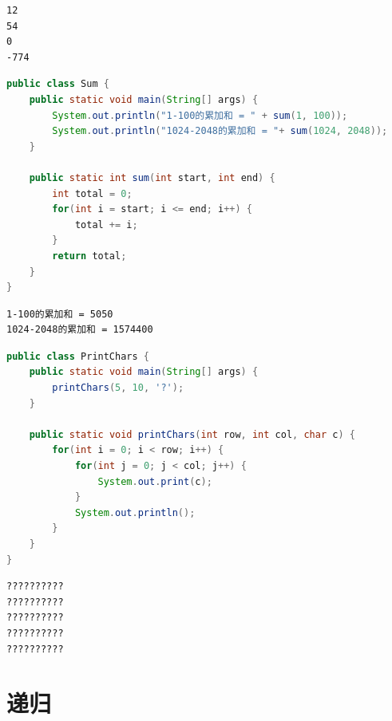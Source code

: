 \begin{tcolorbox}
	\begin{verbatim}
12
54
0
-774
	\end{verbatim}
\end{tcolorbox}

\vspace{0.5cm}


\begin{lstlisting}[language=Java]
public class Sum {
	public static void main(String[] args) {
		System.out.println("1-100的累加和 = " + sum(1, 100));
		System.out.println("1024-2048的累加和 = "+ sum(1024, 2048));
	}

	public static int sum(int start, int end) {
		int total = 0;
		for(int i = start; i <= end; i++) {
			total += i;
		}
		return total;
	}
}
\end{lstlisting}

\begin{tcolorbox}
	\begin{verbatim}
1-100的累加和 = 5050
1024-2048的累加和 = 1574400
	\end{verbatim}
\end{tcolorbox}

\vspace{0.5cm}


\begin{lstlisting}[language=Java]
public class PrintChars {
	public static void main(String[] args) {
		printChars(5, 10, '?');
	}

	public static void printChars(int row, int col, char c) {
		for(int i = 0; i < row; i++) {
			for(int j = 0; j < col; j++) {
				System.out.print(c);
			}
			System.out.println();
		}
	}
}
\end{lstlisting}

\begin{tcolorbox}
	\begin{verbatim}
??????????
??????????
??????????
??????????
??????????
	\end{verbatim}
\end{tcolorbox}

\newpage

\section{递归} \label{recursive}

